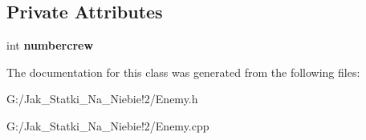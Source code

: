 \subsection*{Private Attributes}
\begin{DoxyCompactItemize}
\item 
\mbox{\label{class_enemy_a712e653e17b1b93b1294247d42354d6d}} 
int {\bfseries numbercrew}
\end{DoxyCompactItemize}


The documentation for this class was generated from the following files\+:\begin{DoxyCompactItemize}
\item 
G\+:/\+Jak\+\_\+\+Statki\+\_\+\+Na\+\_\+\+Niebie!2/Enemy.\+h\item 
G\+:/\+Jak\+\_\+\+Statki\+\_\+\+Na\+\_\+\+Niebie!2/Enemy.\+cpp\end{DoxyCompactItemize}
